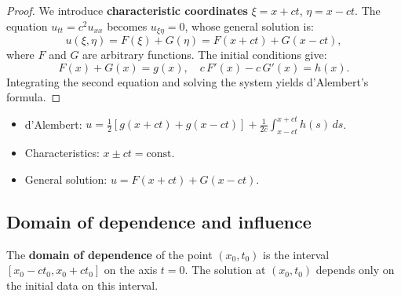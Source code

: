 \begin{proof}
We introduce \textbf{characteristic coordinates} $\xi = x + ct$,
$\eta = x - ct$. The equation $u_{tt} = c^2 u_{xx}$ becomes
$u_{\xi\eta} = 0$, whose general solution is:
\[
    u(\xi, \eta) = F(\xi) + G(\eta) = F(x+ct) + G(x-ct),
\]
where $F$ and $G$ are arbitrary functions. The initial conditions give:
\[
    F(x) + G(x) = g(x), \quad c\, F'(x) - c\, G'(x) = h(x).
\]
Integrating the second equation and solving the system yields d'Alembert's
formula.
\end{proof}

\begin{center}
\end{center}

\begin{keyformulas}[title=\textbf{1D wave equation --- key formulas}]
\begin{itemize}
    \item d'Alembert: $u = \frac{1}{2}[g(x+ct)+g(x-ct)] + \frac{1}{2c}\int_{x-ct}^{x+ct} h(s)\, ds$.
    \item Characteristics: $x \pm ct = \text{const}$.
    \item General solution: $u = F(x+ct) + G(x-ct)$.
\end{itemize}
\end{keyformulas}

\subsection{Domain of dependence and influence}

\begin{definition}
The \textbf{domain of dependence} of the point $(x_0, t_0)$ is the
interval $[x_0 - ct_0, x_0 + ct_0]$ on the axis $t = 0$. The solution
at $(x_0, t_0)$ depends only on the initial data on this interval.
\end{definition}

